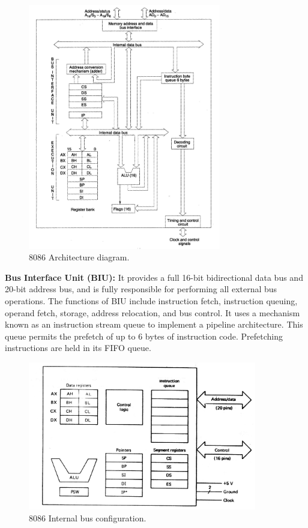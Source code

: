 \documentclass[12pt, a4paper]{scrartcl}
\begin{document}
	\begin{figure}[h]
		\centering
		\includegraphics[width=0.75\textwidth]{images/8086-architecture.png}
		\caption{8086 Architecture diagram.}
		\label{image-1}
	\end{figure}

	\textbf{Bus Interface Unit (BIU): }It provides a full 16-bit bidirectional data bus and 20-bit address bus, and is fully responsible for performing all external bus operations. The functions of BIU include instruction fetch, instruction queuing, operand fetch, storage, address relocation, and bus control. It uses a mechanism known as an instruction stream queue to implement a pipeline architecture. This queue permits the prefetch of up to 6 bytes of instruction code. Prefetching instructions are held in its FIFO queue.

	\begin{figure}[h]
		\centering
		\includegraphics[width=0.89\textwidth]{images/8086-internal-bus-configuration.png}
		\caption{8086 Internal bus configuration.}
		\label{image-2}
	\end{figure}
\end{document}
